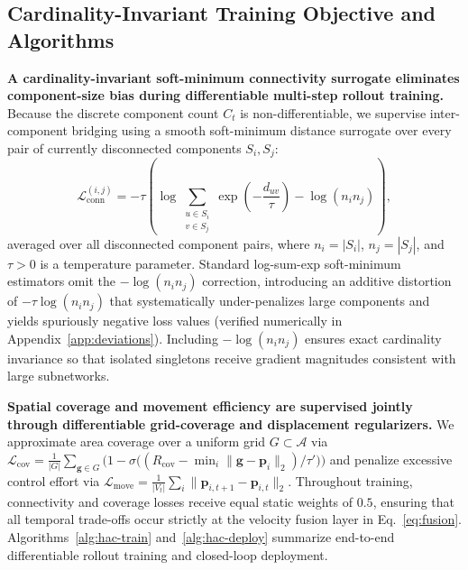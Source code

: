 \documentclass[11pt]{article}
\theoremstyle{plain}
\theoremstyle{definition}
\theoremstyle{remark}
\begin{document}
\subsection{Cardinality-Invariant Training Objective and Algorithms}
\label{sec:objective}
\textbf{A cardinality-invariant soft-minimum connectivity surrogate eliminates component-size bias during differentiable multi-step rollout training.} Because the discrete component count $C_t$ is non-differentiable, we supervise inter-component bridging using a smooth soft-minimum distance surrogate over every pair of currently disconnected components $S_i, S_j$:
\begin{equation}
  \mathcal{L}_{\mathrm{conn}}^{(i,j)} =
  -\tau \left( \log \sum_{\substack{u \in S_i \\ v \in S_j}}
  \exp\!\left(-\frac{d_{uv}}{\tau}\right) - \log(n_i n_j) \right),
  \label{eq:conn-loss}
\end{equation}
averaged over all disconnected component pairs, where $n_i = |S_i|$, $n_j = |S_j|$, and $\tau > 0$ is a temperature parameter. Standard log-sum-exp soft-minimum estimators omit the $-\log(n_i n_j)$ correction, introducing an additive distortion of $-\tau \log(n_i n_j)$ that systematically under-penalizes large components and yields spuriously negative loss values (verified numerically in Appendix~\ref{app:deviations}). Including $-\log(n_i n_j)$ ensures exact cardinality invariance so that isolated singletons receive gradient magnitudes consistent with large subnetworks.

\textbf{Spatial coverage and movement efficiency are supervised jointly through differentiable grid-coverage and displacement regularizers.} We approximate area coverage over a uniform grid $G \subset \mathcal{A}$ via $\mathcal{L}_{\mathrm{cov}} = \frac{1}{|G|} \sum_{\mathbf{g} \in G} \bigl(1 - \sigma\bigl((R_{\mathrm{cov}} - \min_i \|\mathbf{g} - \mathbf{p}_i\|_2)/\tau'\bigr)\bigr)$ and penalize excessive control effort via $\mathcal{L}_{\mathrm{move}} = \frac{1}{|V_t|}\sum_i \|\mathbf{p}_{i,t+1} - \mathbf{p}_{i,t}\|_2$. Throughout training, connectivity and coverage losses receive equal static weights of $0.5$, ensuring that all temporal trade-offs occur strictly at the velocity fusion layer in Eq.~\eqref{eq:fusion}. Algorithms~\ref{alg:hac-train} and~\ref{alg:hac-deploy} summarize end-to-end differentiable rollout training and closed-loop deployment.
\end{document}
